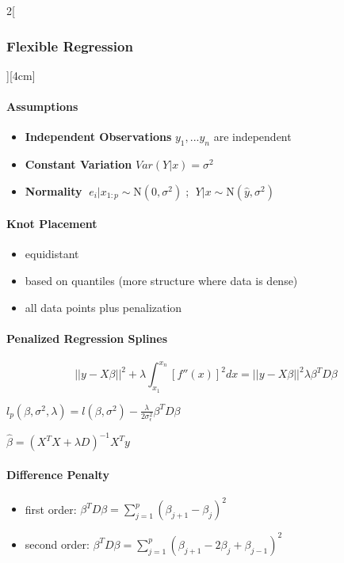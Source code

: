 \documentclass[8pt]{extarticle}
\begin{document}
\begin{multicols}{2}[\subsubsection{Flexible Regression}][4cm]


\paragraph{Assumptions}

\begin{itemize}
\item \textbf{Independent Observations} $y_1,...y_n$ are independent
\item \textbf{Constant Variation} $Var(Y|x) = \sigma^2$
\item \textbf{Normality} $\;e_i|x_{1:p} \sim \mathrm{N}(0,\sigma^2)\;$; $\;Y|x \sim \mathrm{N}(\hat{y},\sigma^2)\;$
\end{itemize}

\paragraph{Knot Placement}

\begin{itemize}
\item equidistant
\item based on quantiles (more structure where data is dense)
\item all data points plus penalization
\end{itemize}


\paragraph{Penalized Regression Splines}

$$|| y {-} X\beta||^2 + \lambda \int_{x_1}^{x_n} \left[ f''(x)\right]^2dx= || y {-} X\beta||^2 \lambda \beta^TD \beta$$

$l_p(\beta,\sigma^2,\lambda) =  l(\beta,\sigma^2) - \frac{\lambda}{2\sigma_\epsilon^2} \beta^T D\beta$

$\hat{\beta} = (X^TX+\lambda D)^{-1}X^Ty$

\paragraph{Difference Penalty} 

\begin{itemize}
\item first order: $\beta^T D\beta = \sum_{j=1}^p (\beta_{j+1} - \beta_j)^2$
\item second order: $\beta^T D\beta = \sum_{j=1}^p (\beta_{j+1} - 2\beta_j + \beta_{j-1})^2$
\end{itemize}



\end{multicols}
\end{document}
